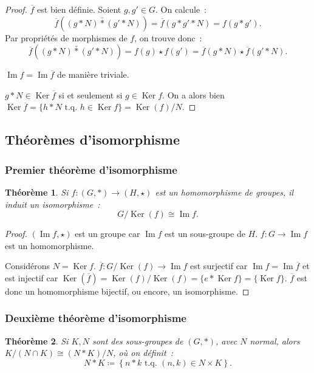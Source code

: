 \documentclass{article}
\newtheorem{thm}{Théorème}[section]
\theoremstyle{definition}
\theoremstyle{remark}
\DeclareMathOperator{\Imf}{Im}
\DeclareMathOperator{\Ker}{Ker}
\newcommand{\tq}{\text{ t.q. }}
\newcommand{\simeqq}{\cong}
\begin{document}
		\begin{proof} $\overline f$ est bien définie. Soient $g, g' \in G$. On calcule~:
		\[\overline f((g*N) \bar * (g'*N)) = \overline f(g*g'*N) = f(g*g').\]
		Par propriétés de morphismes de $f$, on trouve donc~:
		\[\overline f((g*N)\bar *(g'*N)) = f(g) \star f(g') = \overline f(g*N) \star \overline f(g'*N).\]

		$\Imf f = \Imf \overline f$ de manière triviale.

		$g*N \in \Ker \overline f$ si et seulement si $g \in \Ker f$. On a alors bien $\Ker \overline f = \{h*N \tq h \in \Ker f\} = \Ker(f)/N$.
		\end{proof}

	\subsection{Théorèmes d'isomorphisme}
		\subsubsection{Premier théorème d'isomorphisme}
			\begin{thm} Si $f : (G, *) \to (H, \star)$ est un homomorphisme de groupes, il induit un isomorphisme~:
			\[G/\Ker(f) \simeqq \Imf f.\]
			\end{thm}

			\begin{proof} $(\Imf f, \star)$ est un groupe car $\Imf f$ est un sous-groupe de $H$. $f : G \to \Imf f$ est un homomorphisme.

			Considérons $N = \Ker f$. $\overline f : G/\Ker(f) \to \Imf f$ est surjectif car $\Imf f = \Imf \overline f$ et est injectif car
			$\Ker(\overline f) = \Ker(f)/\Ker(f) = \{e * \Ker f\} = \{\Ker f\}$. $\overline f$ est donc un homomorphisme bijectif, ou encore, un isomorphisme.
			\end{proof}

		\subsubsection{Deuxième théorème d'isomorphisme}
			\begin{thm} Si $K, N$ sont des sous-groupes de $(G, *)$, avec $N$ normal, alors $K/(N \cap K) \simeqq (N*K)/N$, où on définit~:
			\[N*K \coloneqq \left\{n*k \tq (n, k) \in N \times K\right\}.\]
			\end{thm}
\end{document}
